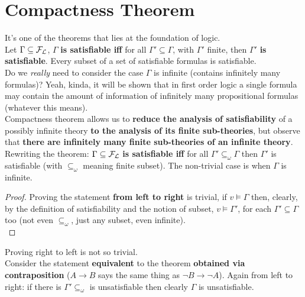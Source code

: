 	\newpage

	\section{Compactness Theorem}
	It's one of the theorems that lies at the foundation of logic. \\

	Let $\Gamma \subseteq \mathcal{F}_\mathcal{L}$, $\Gamma$ \textbf{is satisfiable iff} for all $\Gamma' \subseteq \Gamma$, with $\Gamma'$ finite, then $\Gamma'$ \textbf{is satisfiable}. Every subset of a set of satisfiable formulas is satisfiable.\\

	Do we \textit{really} need to consider the case $\Gamma$ is infinite (contains infinitely many formulas)? Yeah, kinda, it will be shown that in first order logic a single formula may contain the amount of information of infinitely many propositional formulas (whatever this means).\\

	Compactness theorem allows us to \textbf{reduce the analysis of satisfiability} of a possibly infinite theory \textbf{to the analysis of its finite sub-theories}, but observe that \textbf{there are infinitely many finite sub-theories of an infinite theory}.\\

	Rewriting the theorem: $\Gamma \subseteq \mathcal{F}_\mathcal{L}$ \textbf{is satisfiable iff} for all $\Gamma' \subseteq_{\omega} \Gamma$ then $\Gamma'$ is satisfiable (with $\subseteq_{\omega}$ meaning finite subset). The non-trivial case is when $\Gamma$ is infinite.\\

	\begin{proof}
		Proving the statement \textbf{from left to right} is trivial, if $v \models \Gamma$ then, clearly, by the definition of satisfiability and the notion of subset, $v \models \Gamma'$, for each $\Gamma' \subseteq \Gamma$ too (not even $\subseteq_\omega$, just any subset, even infinite).\\
	\end{proof}
	Proving right to left is not so trivial.\\

	Consider the statement \textbf{equivalent} to the theorem \textbf{obtained via contraposition} ($A \rightarrow B$ says the same thing as $\neg B \rightarrow \neg A$). Again from left to right: if there is $\Gamma' \subseteq_\omega$ is unsatisfiable then clearly $\Gamma$ is unsatisfiable.\\

